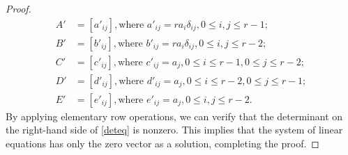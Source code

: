 \documentclass[10pt,a4paper]{amsart}
\begin{document}
\begin{proof}
\begin{align*}
         A'&=[a'_{ij}], \text{where } a'_{ij}=ra_{i}\delta_{ij}, 0\leq i,j\leq r-1;\\
          B'&=[b'_{ij}], \text{where } b'_{ij}=ra_{i}\delta_{ij},0\leq i,j\leq r-2;\\
           C'&=[c'_{ij}], \text{where } c'_{ij}=a_{j},0\leq i\leq r-1,0\leq j\leq r-2;\\
             D'&=[d'_{ij}], \text{where } d'_{ij}=a_{j}, 0\leq i\leq r-2,0\leq j\leq r-1;\\
                E'&=[e'_{ij}], \text{where } e'_{ij}=a_{j},  0\leq i,j\leq r-2.
    \end{align*}
By applying elementary row operations, we can verify that the determinant on the right-hand side of \eqref{deteq} is nonzero. This implies that the system of linear equations has only the zero vector as a solution, completing the proof.\end{proof}
\end{document}
